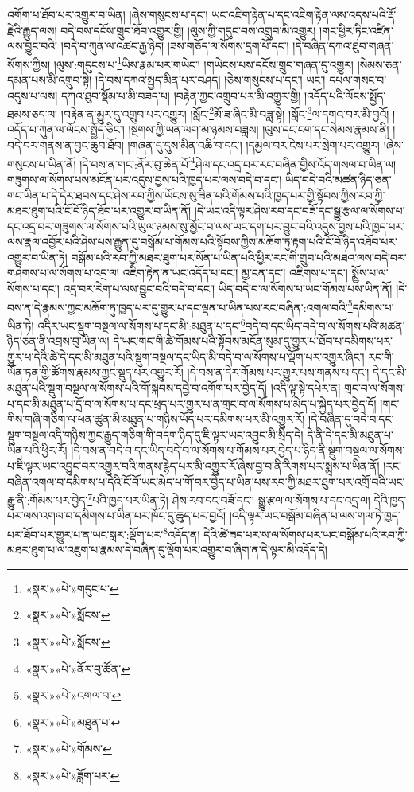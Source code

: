 འགོག་པ་ཐོབ་པར་འགྱུར་བ་ཡིན། །ཞེས་གསུངས་པ་དང་། ཡང་འཇིག་རྟེན་པ་དང་འཇིག་རྟེན་ལས་འདས་པའི་རྡོ་རྗེའི་རྒྱུད་ལས། བདེ་བས་དངོས་གྲུབ་ཐོབ་འགྱུར་གྱི། །ལུས་ཀྱི་གདུང་བས་འགྲུབ་མི་འགྱུར། །གང་ཕྱིར་ཏིང་འཛིན་ལས་བྱུང་བའི། །བདེ་བ་ཀུན་ལ་འཚང་རྒྱ་ཉིད། །ཟས་གཅོད་ལ་སོགས་དྲག་པོ་དང་། །དེ་བཞིན་དཀའ་ཐུབ་གཞན་སོགས་ཀྱིས། །ལུས་:གདུངས་པ་\footnote{«སྣར་»«པེ་»གདུང་པ་}ཡིས་རྣམ་པར་གཡེང་། །གཡེངས་པས་དངོས་གྲུབ་གཞན་དུ་འགྱུར། །སེམས་ཅན་དམན་པས་མི་འགྲུབ་སྟེ། །དེ་བས་དཀའ་སྤྱད་མིན་པར་བཤད། །ཅེས་གསུངས་པ་དང་། ཡང་། དཔལ་གསང་བ་འདུས་པ་ལས། དཀའ་ཐུབ་སྡོམ་པ་མི་བཟད་པ། །བརྟེན་ཀྱང་འགྲུབ་པར་མི་འགྱུར་གྱི། །འདོད་པའི་ལོངས་སྤྱོད་ཐམས་ཅད་ལ། །བརྟེན་ན་མྱུར་དུ་འགྲུབ་པར་འགྱུར། །སློང་\footnote{«སྣར་»«པེ་»སློངས་}མོ་ཟ་ཞིང་མི་བཟླ་སྟེ། །སློང་\footnote{«སྣར་»«པེ་»སློངས་}ལ་དགའ་བར་མི་བྱའོ། །འདོད་པ་ཀུན་ལ་ལོངས་སྤྱོད་ཅིང་། །སྔགས་ཀྱི་ཡན་ལག་མ་ཉམས་བཟླས། །ལུས་དང་ངག་དང་སེམས་རྣམས་ནི། །བདེ་བར་གནས་ན་བྱང་ཆུབ་ཐོབ། །གཞན་དུ་དུས་མིན་འཆི་བ་དང་། །དམྱལ་བར་ངེས་པར་སྲེག་པར་འགྱུར། །ཞེས་གསུངས་པ་ཡིན་ནོ། །དེ་བས་ན་གང་:ནོར་བུ་ཆེན་པོ་\footnote{«སྣར་»«པེ་»ནོར་བུ་ཚོན་}ཤེལ་དང་འདྲ་བར་རང་བཞིན་གྱིས་འོད་གསལ་བ་ཡིན་ལ། གཟུགས་ལ་སོགས་པས་མངོན་པར་འདུས་བྱས་པའི་ཁྱད་པར་ལས་བདེ་བ་དང་། ཡིད་བདེ་བའི་མཚན་ཉིད་ཅན་གང་ཡིན་པ་དེ་དེར་ཐབས་དང་ཤེས་རབ་ཀྱིས་ཡོངས་སུ་ཟིན་པའི་གོམས་པའི་ཁྱད་པར་གྱི་སྟོབས་ཀྱིས་རབ་ཀྱི་མཐར་ཐུག་པའི་ངོ་བོ་ཉིད་ཐོབ་པར་འགྱུར་བ་ཡིན་ནོ། །དེ་ཡང་འདི་ལྟར་ཤེས་རབ་དང་བཟོ་དང་སྒྱུ་རྩལ་ལ་སོགས་པ་དང་འདྲ་བར་གཟུགས་ལ་སོགས་པའི་ཡུལ་ཉམས་སུ་མྱོང་བ་ལས་ཡང་དག་པར་བྱུང་བའི་འདུས་བྱས་པའི་ཁྱད་པར་ལས་རྣལ་འབྱོར་པའི་ཤེས་པས་རྒྱུན་དུ་བསྒོམ་པ་གོམས་པའི་སྟོབས་ཀྱིས་མཆོག་ཏུ་རྟག་པའི་ངོ་བོ་ཉིད་འཐོབ་པར་འགྱུར་བ་ཡིན་ཏེ། བསྒོམ་པའི་རབ་ཀྱི་མཐར་ཐུག་པར་སོན་པ་ཡིན་པའི་ཕྱིར་རང་གི་གྲུབ་པའི་མཐའ་ལས་བདེ་བར་གཤེགས་པ་ལ་སོགས་པ་འདྲ་ལ། འཇིག་རྟེན་ན་ཡང་འདོད་པ་དང་། མྱ་ངན་དང་། འཇིགས་པ་དང་། སྨྱོས་པ་ལ་སོགས་པ་དང་། འདྲ་བར་རེག་པ་ལས་བྱུང་བའི་བདེ་བ་དང་། ཡིད་བདེ་བ་ལ་སོགས་པ་ཡང་གོམས་པས་ཡིན་ནོ། །དེ་བས་ན་དེ་རྣམས་ཀྱང་མཆོག་ཏུ་ཁྱད་པར་དུ་གྱུར་པ་དང་ལྡན་པ་ཡིན་པས་རང་བཞིན་:འགལ་བའི་\footnote{«སྣར་»«པེ་»འགལ་བ་}དམིགས་པ་ཡིན་ཏེ། འདིར་ཡང་སྡུག་བསྔལ་ལ་སོགས་པ་དང་མི་:མཐུན་པ་དང་\footnote{«སྣར་»«པེ་»མཐུན་པ་}བདེ་བ་དང་ཡིད་བདེ་བ་ལ་སོགས་པའི་མཚན་ཉིད་ཅན་ནི་འབྲས་བུ་ཡིན་ལ། དེ་ཡང་གང་གི་ཚེ་གོམས་པའི་སྟོབས་མངོན་སུམ་དུ་གྱུར་པ་ཐོབ་པ་དམིགས་པར་གྱུར་པ་དེའི་ཚེ་དེ་དང་མི་མཐུན་པའི་སྡུག་བསྔལ་དང་ཡིད་མི་བདེ་བ་ལ་སོགས་པ་ལྡོག་པར་འགྱུར་ཞིང་། རང་གི་ཡོན་ཏན་གྱི་ཚོགས་རྣམས་ཀྱང་སྡུད་པར་འགྱུར་རོ། །དེ་བས་ན་དེར་གོམས་པར་གྱུར་པས་གནས་པ་དང་། དེ་དང་མི་མཐུན་པའི་སྡུག་བསྔལ་ལ་སོགས་པའི་གོ་སྐབས་དབྱེ་བ་འགོག་པར་བྱེད་དོ། །འདི་ལྟ་སྟེ་དཔེར་ན། གྲང་བ་ལ་སོགས་པ་དང་མི་མཐུན་པ་དྲོ་བ་ལ་སོགས་པ་དང་ཕྲད་པར་གྱུར་པ་ན་གྲང་བ་ལ་སོགས་པ་མེད་པ་སྐྱེད་པར་བྱེད་དོ། །གང་གིས་གཞི་གཅིག་ལ་ཕན་ཚུན་མི་མཐུན་པ་གཉིས་ཡོད་པར་དམིགས་པར་མི་འགྱུར་རོ། །དེ་བཞིན་དུ་བདེ་བ་དང་སྡུག་བསྔལ་འདི་གཉིས་ཀྱང་རྒྱུད་གཅིག་གི་བདག་ཉིད་དུ་ཇི་ལྟར་ཡང་འབྱུང་མི་སྲིད་དེ། དེ་ནི་དེ་དང་མི་མཐུན་པ་ཡིན་པའི་ཕྱིར་རོ། །དེ་བས་ན་བདེ་བ་དང་ཡིད་བདེ་བ་ལ་སོགས་པ་གོམས་པར་བྱེད་པ་ཉིད་ནི་སྡུག་བསྔལ་ལ་སོགས་པ་ཇི་ལྟར་ཡང་འབྱུང་བར་འགྱུར་བའི་གནས་རྙེད་པར་མི་འགྱུར་རོ་ཞེས་བྱ་བ་ནི་རིགས་པར་སྨྲས་པ་ཡིན་ནོ། །རང་བཞིན་འགལ་བ་དམིགས་པ་དེའི་ངོ་བོ་ཡང་མེད་པ་གོ་བར་བྱེད་པ་ཡིན་པས་རབ་ཀྱི་མཐར་ཐུག་པར་འགྲོ་བའི་ཡང་རྒྱུ་ནི་:གོམས་པར་བྱེད་\footnote{«སྣར་»«པེ་»གོམས་}པའི་ཁྱད་པར་ཡིན་ཏེ། ཤེས་རབ་དང་བཟོ་དང་། སྒྱུ་རྩལ་ལ་སོགས་པ་དང་འདྲ་ལ། དེའི་ཁྱད་པར་ལས་འགལ་བ་དམིགས་པ་ཡིན་པར་ཁོང་དུ་ཆུད་པར་བྱའོ། །འདི་ལྟར་ཡང་བསྒོམ་བཞིན་པ་ལས་གལ་ཏེ་ཁྱད་པར་ཐོབ་པར་གྱུར་པ་ན་ཡང་སླར་:ལྡོག་པར་\footnote{«སྣར་»«པེ་»ཟློག་པར་}འདོད་ན། དེའི་ཚེ་ཟད་པར་ས་ལ་སོགས་པར་ཡང་བསྒོམ་པའི་རབ་ཀྱི་མཐར་ཐུག་པ་ལ་འཇུག་པ་རྣམས་དེ་བཞིན་དུ་ལྡོག་པར་འགྱུར་བ་ཞིག་ན་དེ་ལྟར་མི་འདོད་དེ། 